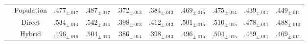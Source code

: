 \begin{tabular}{cc cc cc cc cc}
\addlinespace
\multirow{3}{*}{100} & Population & $.477_{\pm .017}$ & $.487_{\pm .017}$ & $.372_{\pm .013}$ & $.384_{\pm .013}$ & $.469_{\pm .015}$ & $.475_{\pm .014}$ & $.439_{\pm .011}$ & $.449_{\pm .011}$ \\
& Direct & $\bm{.534_{\pm .014}}$ & $\bm{.542_{\pm .014}}$ & $\bm{.398_{\pm .013}}$ & $\bm{.412_{\pm .013}}$ & $\bm{.501_{\pm .015}}$ & $\bm{.510_{\pm .015}}$ & $\bm{.478_{\pm .011}}$ & $\bm{.488_{\pm .010}}$ \\
& Hybrid & $.496_{\pm .016}$ & $.504_{\pm .016}$ & $.386_{\pm .014}$ & $.398_{\pm .013}$ & $.496_{\pm .015}$ & $.504_{\pm .015}$ & $.459_{\pm .011}$ & $.469_{\pm .011}$ \\
\bottomrule
\end{tabular}

